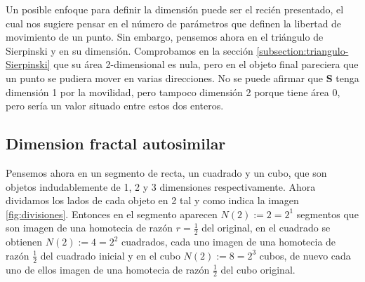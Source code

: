 Un posible enfoque para definir la dimensión puede ser el recién presentado, el cual nos sugiere pensar en el número de parámetros que definen la libertad de movimiento de un punto. Sin embargo, pensemos ahora en el triángulo de Sierpinski y en su dimensión. Comprobamos en la sección \ref{subsection:triangulo-Sierpinski} que su área 2-dimensional es nula, pero en el objeto final pareciera que un punto se pudiera mover en varias direcciones. No se puede afirmar que \textbf{S} tenga dimensión 1 por la movilidad, pero tampoco dimensión 2 porque tiene área 0, pero sería un valor situado entre estos dos enteros.

\subsection{Dimension fractal autosimilar}
\label{subsection:dim-frac-autosimilar}

Pensemos ahora en un segmento de recta, un cuadrado y un cubo, que son objetos indudablemente de 1, 2 y 3 dimensiones respectivamente. Ahora dividamos los lados de cada objeto en 2 tal y como indica la imagen \ref{fig:divisiones}. Entonces en el segmento aparecen $N(2):=2=2^1$ segmentos que son imagen de una homotecia de razón $r=\frac 1 2$ del original, en el cuadrado se obtienen $N(2):=4=2^2$ cuadrados, cada uno imagen de una homotecia de razón $\frac 1 2$ del cuadrado inicial y en el cubo $N(2):=8=2^3$ cubos, de nuevo cada uno de ellos imagen de una homotecia de razón $\frac 1 2$ del cubo original.

